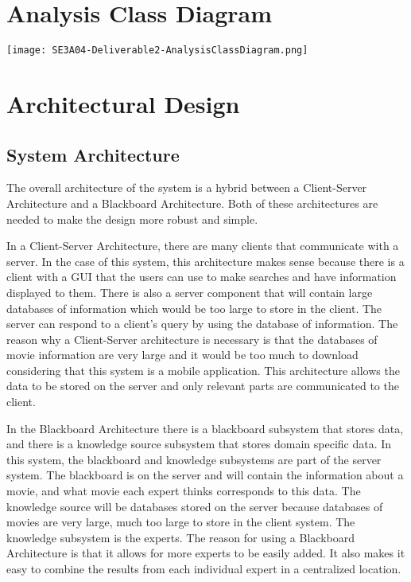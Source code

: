 \documentclass[]{article}
\begin{document}
\section{Analysis Class Diagram}
\label{sec:analysis_class_diagram}
\texttt{[image: SE3A04-Deliverable2-AnalysisClassDiagram.png]}


\section{Architectural Design}
\label{sec:architectural_design}

\subsection{System Architecture}
\label{sub:system_architecture}
The overall architecture of the system is a hybrid between a Client-Server Architecture and a Blackboard Architecture. Both of these architectures are needed to make the design more robust and simple.

In a Client-Server Architecture, there are many clients that communicate with a server. In the case of this system, this architecture makes sense because there is a client with a GUI that the users can use to make searches and have information displayed to them. There is also a server component that will contain large databases of information which would be too large to store in the client. The server can respond to a client's query by using the database of information. The reason why a Client-Server architecture is necessary is that the databases of movie information are very large and it would be too much to download considering that this system is a mobile application. This architecture allows the data to be stored on the server and only relevant parts are communicated to the client.

In the Blackboard Architecture there is a blackboard subsystem that stores data, and there is a knowledge source subsystem that stores domain specific data. In this system, the blackboard and knowledge subsystems are part of the server system. The blackboard is on the server and will contain the information about a movie, and what movie each expert thinks corresponds to this data. The knowledge source will be databases stored on the server because databases of movies are very large, much too large to store in the client system. The knowledge subsystem is the experts. The reason for using a Blackboard Architecture is that it allows for more experts to be easily added. It also makes it easy to combine the results from each individual expert in a centralized location.
\end{document}
